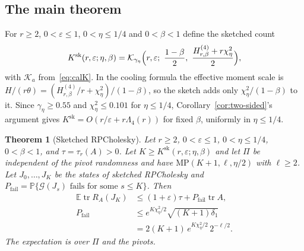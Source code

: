 \documentclass[11pt]{article}
\newtheorem{theorem}{Theorem}[section]
\theoremstyle{definition}\newtheorem{definition}[theorem]{Definition}
\theoremstyle{remark}\newtheorem{remark}[theorem]{Remark}
\newcommand{\E}{\mathbb E}
\newcommand{\Prob}{\mathbb P}
\newcommand{\eps}{\varepsilon}
\newcommand{\tr}{\operatorname{tr}}
\newcommand{\calK}{\mathcal K}
\newcommand{\calG}{\mathcal G}
\newcommand{\1}{\mathbf 1}
\newcommand{\MP}{\mathrm{MP}}
\newcommand{\Pfail}{P_{\mathrm{fail}}}
\begin{document}
\subsection{The main theorem}
For $r\ge2$, $0<\eps\le1$, $0<\eta\le1/4$ and $0<\beta<1$ define the
sketched count
\begin{equation}\label{eq:Ksk}
 K^{\mathrm{sk}}(r,\eps;\eta,\beta)
 =\calK_{\gamma_\eta}\Bigl(r,\eps;\ \frac{1-\beta}2,\
 \frac{H^{(4)}_{r,\beta}+r\chi^2_\eta}2\Bigr),
\end{equation}
with $\calK_a$ from~\eqref{eq:calK}. In the cooling formula the
effective moment scale is $H/(r\theta)=(H^{(4)}_{r,\beta}/r+\chi^2_\eta)/(1-\beta)$,
so the sketch adds only $\chi^2_\eta/(1-\beta)$ to it. Since $\gamma_\eta\ge0.55$
and $\chi^2_\eta\le0.101$ for $\eta\le1/4$, Corollary~\ref{cor:two-sided}'s
argument gives $K^{\mathrm{sk}}=O(r/\eps+r\Lambda_4(r))$ for fixed
$\beta$, uniformly in $\eta\le1/4$.

\begin{theorem}[Sketched RPCholesky]\label{thm:sketch}
Let $r\ge2$, $0<\eps\le1$, $0<\eta\le1/4$, $0<\beta<1$, and
$\tau=\tau_r(A)>0$. Let $K\ge K^{\mathrm{sk}}(r,\eps;\eta,\beta)$ and let
$\Pi$ be independent of the pivot randomness and have
$\MP(K+1,\ell,\eta/2)$ with $\ell\ge2$. Let $J_0,\dots,J_K$ be the
states of sketched RPCholesky and
$\Pfail=\Prob\{\calG(J_s)\text{ fails for some }s\le K\}$. Then
\begin{equation}\label{eq:sketch-main}
 \begin{aligned}
 \E\tr R_A(J_K)&\le(1+\eps)\tau+\Pfail\tr A,\\
 \Pfail&\le e^{K\chi^2_\eta/2}\sqrt{(K+1)\delta_1}\\
 &=2(K+1)\,e^{K\chi^2_\eta/2}\,2^{-\ell/2}.
 \end{aligned}
\end{equation}
The expectation is over $\Pi$ and the pivots.
\end{theorem}
\end{document}

